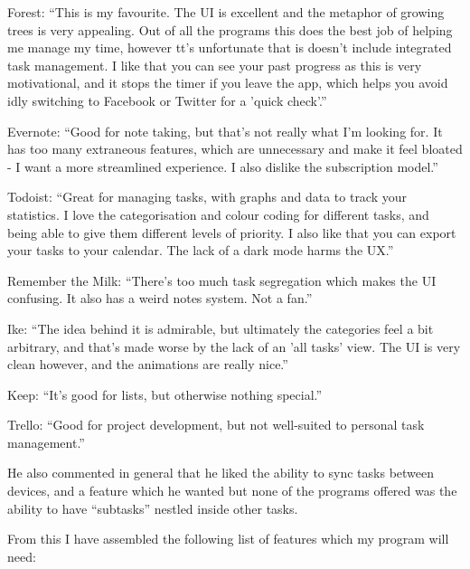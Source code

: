 \documentclass{article}
\begin{document}
\begin{description}
\item Forest: ``This is my favourite. The UI is excellent and the metaphor of
  growing trees is very appealing. Out of all the programs this does the best
  job of helping me manage my time, however tt's unfortunate that is doesn't
  include integrated task management. I like that you can see your past progress
  as this is very motivational, and it stops the timer if you leave the app,
  which helps you avoid idly switching to Facebook or Twitter for a 'quick
  check'.''
\item Evernote: ``Good for note taking, but that's not really what I'm looking
  for. It has too many extraneous features, which are unnecessary and make it
  feel bloated - I want a more streamlined experience. I also dislike the
  subscription model.''
\item Todoist: ``Great for managing tasks, with graphs and data to track your
  statistics. I love the categorisation and colour coding for different tasks,
  and being able to give them different levels of priority. I also like that you
  can export your tasks to your calendar. The lack of a dark mode harms the
  UX.''
\item Remember the Milk: ``There's too much task segregation which makes the UI
  confusing. It also has a weird notes system. Not a fan.''
\item Ike: ``The idea behind it is admirable, but ultimately the categories feel
  a bit arbitrary, and that's made worse by the lack of an 'all tasks' view. The
  UI is very clean however, and the animations are really nice.''
\item Keep: ``It's good for lists, but otherwise nothing special.''
\item Trello: ``Good for project development, but not well-suited to personal
  task management.''
\end{description}

He also commented in general that he liked the ability to sync tasks between
devices, and a feature which he wanted but none of the programs offered was the
ability to have ``subtasks'' nestled inside other tasks.

From this I have assembled the following list of features which my program will
need:
\end{document}
